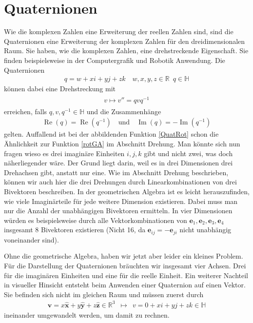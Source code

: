 %
%
%
\section{Quaternionen}

Wie die komplexen Zahlen eine Erweiterung der reellen Zahlen sind, sind die Quaternionen eine Erweiterung der komplexen Zahlen für den dreidimensionalen Raum. Sie haben, wie die komplexen Zahlen, eine drehstreckende Eigenschaft.
Sie finden beispielsweise in der Computergrafik und Robotik Anwendung.
Die Quaternionen
\begin{align}
q = w + xi + yj + zk \quad w,x,y,z \in \mathbb{R}\enspace q \in \mathbb{H}
\end{align}
können dabei eine Drehstreckung mit
\begin{align} \label{QuatRot}
\begin{split} 
v \mapsto v'' = qvq^{-1}
\end{split}
\end{align}
erreichen, falls $q,v,q^{-1} \in \mathbb{H}$ und die Zusammenhänge
\begin{align}
\operatorname{Re}(q) = \operatorname{Re}(q^{-1})\quad\text{und}\quad \operatorname{Im}(q) = -\operatorname{Im}(q^{-1})
\end{align}
gelten. Auffallend ist bei der abbildenden Funktion \eqref{QuatRot} schon die Ähnlichkeit zur Funktion \eqref{rotGA} im Abschnitt Drehung. Man könnte sich nun fragen wieso es drei imaginäre Einheiten $i,j,k$ gibt und nicht zwei, was doch näherliegender wäre. Der Grund liegt darin, weil es in drei Dimensionen drei Drehachsen gibt, anstatt nur eine. Wie im Abschnitt Drehung beschrieben, können wir auch hier die drei Drehungen durch Linearkombinationen von drei Bivektoren beschreiben. In der geometrischen Algebra ist es leicht herauszufinden, wie viele Imaginärteile für jede weitere Dimension existieren. Dabei muss man nur die Anzahl der unabhängigen Bivektoren ermitteln. In vier Dimensionen würden es beispielsweise durch alle Vektorkombinationen von $\mathbf{e}_1, \mathbf{e}_2,\mathbf{e}_3, \mathbf{e}_4$ insgesamt 8 Bivektoren existieren (Nicht 16, da $\mathbf{e}_{ij} = -\mathbf{e}_{ji}$ nicht unabhängig voneinander sind).

Ohne die geometrische Algebra, haben wir jetzt aber leider ein kleines Problem. Für die Darstellung der Quaternionen bräuchten wir insgesamt vier Achsen. Drei für die imaginären Einheiten und eine für die reelle Einheit. Ein weiterer Nachteil in visueller Hinsicht entsteht beim Anwenden einer Quaternion auf einen Vektor. Sie befinden sich nicht im gleichen Raum und müssen zuerst durch
\begin{align}
\mathbf{v} = x\mathbf{\hat{x}} + y\mathbf{\hat{y}} + z \mathbf{\hat{z}} \in \mathbb{R}^3 \enspace\mapsto\enspace v = 0 + xi + yj + zk \in \mathbb{H}
\end{align}
ineinander umgewandelt werden, um damit zu rechnen.

